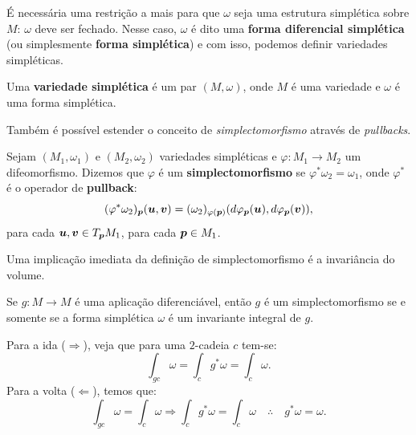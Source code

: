 É necessária uma restrição a mais para que $\omega$ seja uma estrutura simplética sobre $M$: $\omega$ deve ser fechado. Nesse caso, $\omega$ é dito uma \textbf{forma diferencial simplética} (ou simplesmente \textbf{forma simplética}) e com isso, podemos definir variedades simpléticas.

\begin{definition}
    Uma \textbf{variedade simplética} é um par $(M, \omega)$, onde $M$ é uma variedade e $\omega$ é uma forma simplética.
\end{definition}

Também é possível estender o conceito de \textit{simplectomorfismo} através de \textit{pullbacks}.

\begin{definition}[Simplectomorfismo]\label{def:simplectomorfismo}
    Sejam $(M_1, \omega_1)$ e $(M_2, \omega_2)$ variedades simpléticas e $\varphi: M_1 \to M_2$ um difeomorfismo. Dizemos que $\varphi$ é um \textbf{simplectomorfismo} se $\varphi^* \omega_2 = \omega_1$, onde $\varphi^*$ é o operador de \textbf{pullback}:
    \begin{equation*}
        (\varphi^* \omega_2)_{\bm p}(\bm u,\bm v) = (\omega_2)_{\varphi(\bm p)} (d \varphi_{\bm p}(\bm u), d \varphi_{\bm p}(\bm v)),
    \end{equation*}
    para cada $\bm u, \bm v \in T_{\bm p} M_1$, para cada $\bm p \in M_1$. 
\end{definition}

Uma implicação imediata da definição de simplectomorfismo é a invariância do volume.

\begin{theorem}\label{teorema:simplectomorfismo_invariante_integral}
    Se $g: M \to M$ é uma aplicação diferenciável, então $g$ é um simplectomorfismo se e somente se a forma simplética $\omega$ é um invariante integral de $g$.
\end{theorem}
\begin{Proof}
    Para a ida ($\Rightarrow$), veja que para uma $2$-cadeia $c$ tem-se:
    \begin{equation*}
        \int_{gc} \omega = \int_{c} g^* \omega = \int_{c} \omega.
    \end{equation*}
    Para a volta ($\Leftarrow$), temos que:
    \begin{equation*}
        \int_{gc} \omega = \int_{c} \omega
        \Longrightarrow
        \int_{c} g^* \omega = \int_{c} \omega
        \quad \therefore \quad
        g^* \omega = \omega.
    \end{equation*}
\end{Proof}

